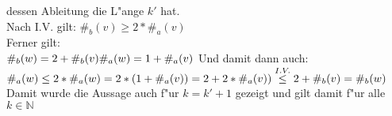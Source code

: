 \documentclass{article}
\newcommand{\gap}{\null\ \\ \\}
\newcommand{\rA}{\rightarrow}
\begin{document}
    dessen Ableitung die L"ange $k'$ hat.\\
Nach I.V. gilt: $\#_b(v) \geq 2 * \#_a(v)$\\
Ferner gilt:\\$
    \#_b(w) = 2 + \#_b(v)\\
    \#_a(w) = 1 +\#_a(v)\\
    $
Und damit dann auch:\\$
    \#_a(w) \leq 2 * \#_a(w) 
        = 2 * (1 +\#_a(v))
        = 2 + 2 * \#_a(v))
        \overset{I.V.}{\leq} 2 + \#_b(v) = \#_b(w)\\
    $\\
Damit wurde die Aussage auch f"ur $k = k' + 1$ gezeigt und gilt damit f"ur alle 
    $k \in \mathbb{N}$\\

\end{document}
